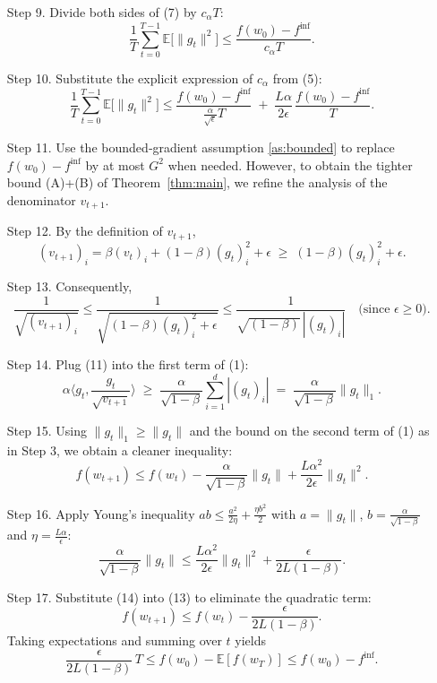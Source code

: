 \documentclass[11pt]{article}
\begin{document}
\begin{enumerate}
\item[Step 9.] Divide both sides of (7) by $c_{\alpha}T$:
\[
\frac{1}{T}\sum_{t=0}^{T-1}
\mathbb{E}\!\bigl[\|g_t\|^{2}\bigr]
\le \frac{f(w_0)-f^{\inf}}{c_{\alpha}T}.
\tag{8}
\]

\item[Step 10.] Substitute the explicit expression of $c_{\alpha}$ from (5):
\[
\frac{1}{T}\sum_{t=0}^{T-1}
\mathbb{E}\!\bigl[\|g_t\|^{2}\bigr]
\le
\frac{f(w_0)-f^{\inf}}{\displaystyle
\frac{\alpha}{\sqrt{\epsilon}}T}
\;+\;
\frac{L\alpha}{2\epsilon}\,
\frac{f(w_0)-f^{\inf}}{T}.
\tag{9}
\]

\item[Step 11.] Use the bounded‑gradient assumption \ref{as:bounded}
to replace $f(w_0)-f^{\inf}$ by at most $G^{2}$ when needed.
However, to obtain the tighter bound (A)+(B) of Theorem~\ref{thm:main},
we refine the analysis of the denominator $v_{t+1}$.

\item[Step 12.] By the definition of $v_{t+1}$,
\[
(v_{t+1})_i
= \beta (v_t)_i + (1-\beta)(g_t)_i^{2} + \epsilon
\;\ge\;
(1-\beta)(g_t)_i^{2} + \epsilon .
\tag{10}
\]

\item[Step 13.] Consequently,
\[
\frac{1}{\sqrt{(v_{t+1})_i}}
\le
\frac{1}{\sqrt{(1-\beta)(g_t)_i^{2}+\epsilon}}
\le
\frac{1}{\sqrt{(1-\beta)}\,| (g_t)_i |}
\quad\text{(since }\epsilon\ge 0\text{)}.
\tag{11}
\]

\item[Step 14.] Plug (11) into the first term of (1):
\[
\alpha\Big\langle g_t,\frac{g_t}{\sqrt{v_{t+1}}}\Big\rangle
\;\ge\;
\frac{\alpha}{\sqrt{1-\beta}}\sum_{i=1}^{d}|(g_t)_i|
\;=\;
\frac{\alpha}{\sqrt{1-\beta}}\|g_t\|_{1}.
\tag{12}
\]

\item[Step 15.] Using $\|g_t\|_{1}\ge\|g_t\|$ and the bound on the second term of (1)
as in Step 3, we obtain a cleaner inequality:
\[
f(w_{t+1}) \le f(w_t)
- \frac{\alpha}{\sqrt{1-\beta}}\|g_t\|
+ \frac{L\alpha^{2}}{2\epsilon}\|g_t\|^{2}.
\tag{13}
\]

\item[Step 16.] Apply Young’s inequality $ab\le \frac{a^{2}}{2\eta}+ \frac{\eta b^{2}}{2}$
with $a=\|g_t\|$, $b=\frac{\alpha}{\sqrt{1-\beta}}$ and $\eta=\frac{L\alpha}{\epsilon}$:
\[
\frac{\alpha}{\sqrt{1-\beta}}\|g_t\|
\le
\frac{L\alpha^{2}}{2\epsilon}\|g_t\|^{2}
+\frac{\epsilon}{2L(1-\beta)} .
\tag{14}
\]

\item[Step 17.] Substitute (14) into (13) to eliminate the quadratic term:
\[
f(w_{t+1}) \le f(w_t) - \frac{\epsilon}{2L(1-\beta)} .
\tag{15}
\]
Taking expectations and summing over $t$ yields
\[
\frac{\epsilon}{2L(1-\beta)}\,T
\le f(w_0)-\mathbb{E}[f(w_T)]\le f(w_0)-f^{\inf}.
\tag{16}
\]


\end{enumerate}
\end{document}
